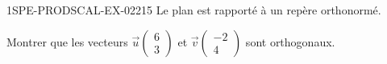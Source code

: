 \begin{exercice}{1SPE-PRODSCAL-EX-022}{1}{5}
Le plan est rapporté à un repère orthonormé.

Montrer que les vecteurs $\vec{u}\begin{pmatrix} 6 \\ 3 \end{pmatrix}$ et $\vec{v}\begin{pmatrix} -2 \\ 4 \end{pmatrix}$ sont orthogonaux.
\end{exercice}
